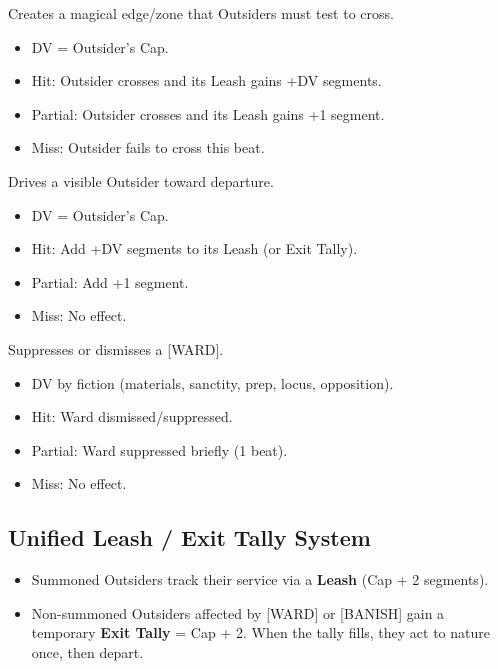 \begin{description}[leftmargin=1.5em, style=nextline]
  \item[WARD:] Creates a magical edge/zone that Outsiders must test to cross.
    \begin{itemize}
      \item DV = Outsider’s Cap.
      \item Hit: Outsider crosses and its Leash gains +DV segments.
      \item Partial: Outsider crosses and its Leash gains +1 segment.
      \item Miss: Outsider fails to cross this beat.
    \end{itemize}
  \item[BANISH:] Drives a visible Outsider toward departure.
    \begin{itemize}
      \item DV = Outsider’s Cap.
      \item Hit: Add +DV segments to its Leash (or Exit Tally).
      \item Partial: Add +1 segment.
      \item Miss: No effect.
    \end{itemize}
  \item[UNWARD:] Suppresses or dismisses a [WARD].
    \begin{itemize}
      \item DV by fiction (materials, sanctity, prep, locus, opposition).
      \item Hit: Ward dismissed/suppressed.
      \item Partial: Ward suppressed briefly (1 beat).
      \item Miss: No effect.
    \end{itemize}
\end{description}

\subsection{Unified Leash / Exit Tally System}
\begin{itemize}
  \item Summoned Outsiders track their service via a \textbf{Leash} (Cap + 2 segments).
  \item Non-summoned Outsiders affected by [WARD] or [BANISH] gain a temporary \textbf{Exit Tally} = Cap + 2. When the tally fills, they act to nature once, then depart.
\end{itemize}

